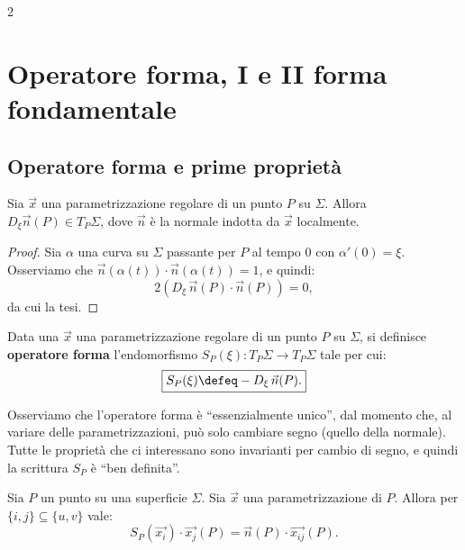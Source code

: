 \begin{multicols*}{2}
    \section{Operatore forma, I e II forma fondamentale}

    \subsection{Operatore forma e prime proprietà}

    \begin{proposition}
        Sia $\vec{x}$ una parametrizzazione regolare di un punto
        $P$ su $\Sigma$. Allora $D_\xi \vec{n}(P) \in T_P \Sigma$,
        dove $\vec{n}$ è la normale indotta da $\vec{x}$ localmente.
    \end{proposition}

    \begin{proof}
        Sia $\alpha$ una curva su $\Sigma$ passante per $P$ al tempo $0$
        con $\alpha'(0) = \xi$.
        Osserviamo che $\vec{n}(\alpha(t)) \cdot \vec{n}(\alpha(t)) = 1$,
        e quindi:
        \[
            2 (D_\xi \, \vec{n}(P) \cdot \vec{n}(P)) = 0,
        \]
        da cui la tesi.
    \end{proof}

    \begin{definition}
        Data una $\vec{x}$ una parametrizzazione regolare di un
        punto $P$ su $\Sigma$, si definisce \textbf{operatore forma}
        l'endomorfismo $S_P(\xi) : T_P \Sigma \to T_P \Sigma$ tale per cui:
        \[
            \boxed{S_P(\xi) \defeq - D_\xi \, \vec{n}(P).}
        \]
    \end{definition}

    \begin{remark}
        Osserviamo che l'operatore forma è ``essenzialmente unico'', dal momento
        che, al variare delle parametrizzazioni, può solo cambiare segno (quello della
        normale). Tutte le proprietà che ci interessano sono invarianti per cambio di
        segno, e quindi la scrittura $S_P$ è ``ben definita''.
    \end{remark}

    \begin{lemma} \label{lem:formula_operatore_forma}
        Sia $P$ un punto su una superficie $\Sigma$. Sia $\vec{x}$ una
        parametrizzazione di $P$. Allora per $\{i, j\} \subseteq \{u, v\}$ vale:
        \[
            \boxed{S_P(\vec{x_i}) \cdot \vec{x_j}(P) = \vec{n}(P) \cdot \vec{x_{ij}}(P).}
        \]
    \end{lemma}


\end{multicols*}
